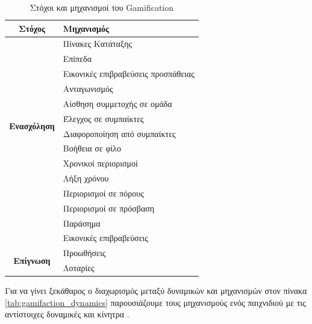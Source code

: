 	\begin{table}[H]
		\begin{center}
		    \begin{tabular}{|c|l|}
		    \hline
		    \rowcolor{grayy}
		    \textbf{Στόχος} & \textbf{Μηχανισμός}
		    \\ \hline    
		    \multirow{12}{*}{\textbf{Ενασχόληση}} & Πίνακες Κατάταξης \\ & Επίπεδα \\ & Εικονικές επιβραβεύσεις προσπάθειας \\ & Ανταγωνισμός \\ & Αίσθηση συμμετοχής σε ομάδα \\ &  Έλεγχος σε συμπαίκτες \\ &  Διαφοροποίηση από συμπαίκτες \\ & Βοήθεια σε φίλο \\ & Χρονικοί περιορισμοί \\ & Λήξη χρόνου \\ & Περιορισμοί σε πόρους \\ \hline
		    \multirow{3}{*}{\textbf{Αφοσίωση}}  & Περιορισμοί σε πρόσβαση \\ & Παράσημα \\ & Εικονικές επιβραβεύσεις \\ \hline
		    \multirow{3}{*}{\textbf{Επίγνωση}}  & Προωθήσεις \\ & Λοταρίες  \\ \hline
		    \end{tabular}
		    \caption{Στόχοι και μηχανισμοί του Gamification}
			\label{tab:gamifaction_mechanisms}
		\end{center}
	\end{table}

		Για να γίνει ξεκάθαρος ο διαχωρισμός μεταξύ δυναμικών και μηχανισμών στον πίνακα \ref{tab:gamifaction_dynamics} παρουσιάζουμε τους μηχανισμούς ενός παιχνιδιού με τις αντίστοιχες δυναμικές και κίνητρα \cite{BlohmIvo2013}.
	

